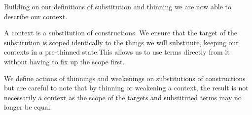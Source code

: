 Building on our definitions of substitution and thinning we are now
able to describe our context.

A context is a substitution of constructions. We ensure that the target
of the substitution is scoped identically to the things we will substitute,
keeping our contexts in a pre-thinned state.This allows us to use terms
directly from it without having to fix up the scope first.

We define actions of thinnings and weakenings on substitutions of constructions
but are careful to note that by thinning or weakening a context, the result
is not necessarily a context as the scope of the targets and substituted terms
may no longer be equal.

\begin{code}%
\>[0]\AgdaSpace{}%
\AgdaSymbol{:}\AgdaSpace{}%
\AgdaSpace{}%
\AgdaSpace{}%
\<%
\\
\>[0]\AgdaSpace{}%
\AgdaSpace{}%
\AgdaSymbol{=}\AgdaSpace{}%
\AgdaSpace{}%
\AgdaOperator{\AgdaFunction{⇒[}}\AgdaSpace{}%
\AgdaSpace{}%
\AgdaSpace{}%
\AgdaOperator{\AgdaFunction{]}}\AgdaSpace{}%
\<%
\\
%
\\[\AgdaEmptyExtraSkip]%
\>[0]%
\>[6]\AgdaSymbol{:}\AgdaSpace{}%
\AgdaSpace{}%
\AgdaSymbol{(}\AgdaSpace{}%
\AgdaOperator{\AgdaFunction{⇒[}}\AgdaSpace{}%
\AgdaSpace{}%
\AgdaSpace{}%
\AgdaOperator{\AgdaFunction{]\AgdaUnderscore{}}}\AgdaSymbol{)}\<%
\\
\>[0]%
\>[6]\AgdaSymbol{:}\AgdaSpace{}%
\AgdaSpace{}%
\AgdaSymbol{(}\AgdaSpace{}%
\AgdaOperator{\AgdaFunction{⇒[}}\AgdaSpace{}%
\AgdaSpace{}%
\AgdaSpace{}%
\AgdaOperator{\AgdaFunction{]\AgdaUnderscore{}}}\AgdaSymbol{)}\<%
\end{code}

